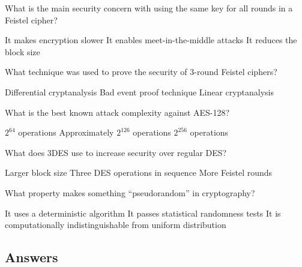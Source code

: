 \documentclass[10pt,a4paper,american]{exam}
\begin{document}
\begin{questions}
	\question What is the main security concern with using the same key for all rounds in a Feistel cipher?
	\begin{randomizechoices}
		\choice It makes encryption slower
		\CorrectChoice It enables meet-in-the-middle attacks
		\choice It reduces the block size
	\end{randomizechoices}

	\question What technique was used to prove the security of 3-round Feistel ciphers?
	\begin{randomizechoices}
		\choice Differential cryptanalysis
		\CorrectChoice Bad event proof technique
		\choice Linear cryptanalysis
	\end{randomizechoices}

	\question What is the best known attack complexity against AES-128?
	\begin{randomizechoices}
		\choice $2^{64}$ operations
		\CorrectChoice Approximately $2^{126}$ operations
		\choice $2^{256}$ operations
	\end{randomizechoices}

	\question What does 3DES use to increase security over regular DES?
	\begin{randomizechoices}
		\choice Larger block size
		\CorrectChoice Three DES operations in sequence
		\choice More Feistel rounds
	\end{randomizechoices}

	\question What property makes something ``pseudorandom'' in cryptography?
	\begin{randomizechoices}
		\choice It uses a deterministic algorithm
		\choice It passes statistical randomness tests
		\CorrectChoice It is computationally indistinguishable from uniform distribution
	\end{randomizechoices}

\end{questions}

\clearpage

\subsection*{Answers}
\printkeytable
\end{document}
